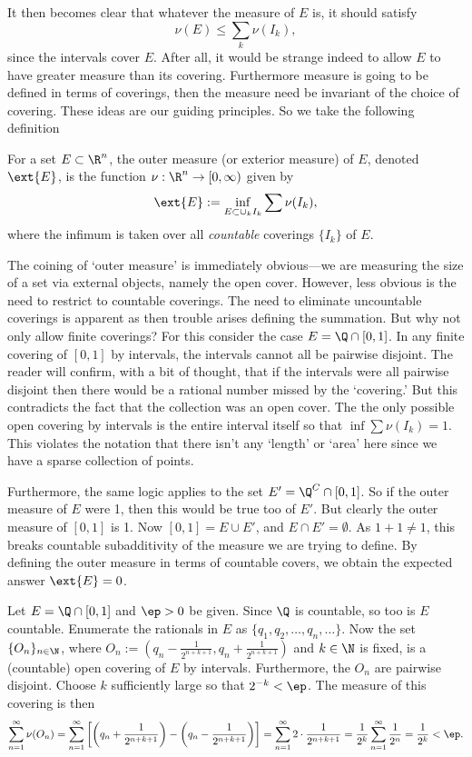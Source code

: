 It then becomes clear that whatever the measure of $E$ is, it should satisfy
	\[
	\nu(E) \leq \sum_k \nu(I_k),
	\]
since the intervals cover $E$. After all, it would be strange indeed to allow $E$ to have greater measure than its covering. Furthermore measure is going to be defined in terms of coverings, then the measure need be invariant of the choice of covering. These ideas are our guiding principles. So we take the following definition 


\begin{dfn}
For a set $E \subset \R^n$, the outer measure (or exterior measure) of $E$, denoted $\ext{E}$, is the function $\nu: \R^n \to [0,\infty)$ given by
	\[
	\ext{E}:= \inf_{E \subset \cup_k I_k} \sum \nu(I_k),
	\]
where the infimum is taken over all \emph{countable} coverings $\{I_k\}$ of $E$. 
\end{dfn}


The coining of `outer measure' is immediately obvious---we are measuring the size of a set via external objects, namely the open cover. However, less obvious is the need to restrict to countable coverings. The need to eliminate uncountable coverings is apparent as then trouble arises defining the summation. But why not only allow finite coverings? For this consider the case $E= \Q \cap [0,1]$. In any finite covering of $[0,1]$ by intervals, the intervals cannot all be pairwise disjoint. The reader will confirm, with a bit of thought, that if the intervals were all pairwise disjoint then there would be a rational number missed by the `covering.' But this contradicts the fact that the collection was an open cover. The the only possible open covering by intervals is the entire interval itself so that $\inf \sum \nu(I_k)=1$. This violates the notation that there isn't any `length' or `area' here since we have a sparse collection of points. 


Furthermore, the same logic applies to the set $E'=\Q^C \cap [0,1]$. So if the outer measure of $E$ were 1, then this would be true too of $E'$. But clearly the outer measure of $[0,1]$ is 1. Now $[0,1]=E \cup E'$, and $E \cap E'=\emptyset$. As $1+1 \neq 1$, this breaks countable subadditivity of the measure we are trying to define. By defining the outer measure in terms of countable covers, we obtain the expected answer $\ext{E}=0$. 


\begin{ex}
Let $E=\Q \cap [0,1]$ and $\ep>0$ be given. Since $\Q$ is countable, so too is $E$ countable. Enumerate the rationals in $E$ as $\{q_1,q_2,\ldots,q_n,\ldots\}$. Now the set $\{O_n\}_{n \in \N}$, where $O_n:= (q_n- \frac{1}{2^{n+k+1}}, q_n+\frac{1}{2^{n+k+1}})$ and $k \in \N$ is fixed, is a (countable) open covering of $E$ by intervals. Furthermore, the $O_n$ are pairwise disjoint. Choose $k$ sufficiently large so that $2^{-k}<\ep$. The measure of this covering is then
	\[
	\sum_{n=1}^\infty \nu(O_n)= \sum_{n=1}^\infty \left[ \left(q_n+\frac{1}{2^{n+k+1}}\right) - \left(q_n- \frac{1}{2^{n+k+1}}\right) \right]= \sum_{n=1}^\infty 2 \cdot \dfrac{1}{2^{n+k+1}}= \dfrac{1}{2^k} \sum_{n=1}^\infty \dfrac{1}{2^n}= \dfrac{1}{2^k}<\ep.
	\] \xqed
\end{ex}


